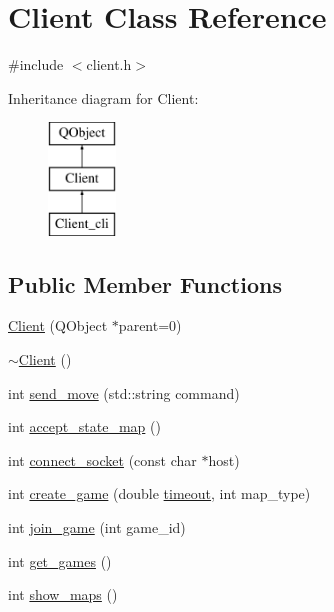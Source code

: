 \hypertarget{classClient}{\section{Client Class Reference}
\label{classClient}
}


{\ttfamily \#include $<$client.\-h$>$}

Inheritance diagram for Client\-:\begin{figure}[H]
\begin{center}
\leavevmode
\includegraphics[height=3.000000cm]{classClient}
\end{center}
\end{figure}
\subsection*{Public Member Functions}
\begin{DoxyCompactItemize}
\item 
\hyperlink{classClient_a7832757f3fa37f564a21cb2b79b2baad}{Client} (Q\-Object $\ast$parent=0)
\item 
\hyperlink{classClient_a840e519ca781888cbd54181572ebe3a7}{$\sim$\-Client} ()
\item 
int \hyperlink{classClient_ac77cbaaec18851fcf9ab5bd58a90ef43}{send\-\_\-move} (std\-::string command)
\item 
int \hyperlink{classClient_a9e4a89c3937649327cceaf97e228c965}{accept\-\_\-state\-\_\-map} ()
\item 
int \hyperlink{classClient_ad3a29bf18762bd72c9362b71ac48956d}{connect\-\_\-socket} (const char $\ast$host)
\item 
int \hyperlink{classClient_ad7aad7d93ebed9931fa65b6c7eff32f5}{create\-\_\-game} (double \hyperlink{classClient_a37ec3a1f75d0ddcf25354b2bc552a039}{timeout}, int map\-\_\-type)
\item 
int \hyperlink{classClient_a0b123c350c7462456e4bb65109fc1578}{join\-\_\-game} (int game\-\_\-id)
\item 
int \hyperlink{classClient_a36a02d46f4bedcaa9ef9724e992cae60}{get\-\_\-games} ()
\item 
int \hyperlink{classClient_aaf73009df3d352ef47e282d0c65cb8e1}{show\-\_\-maps} ()
\end{DoxyCompactItemize}
